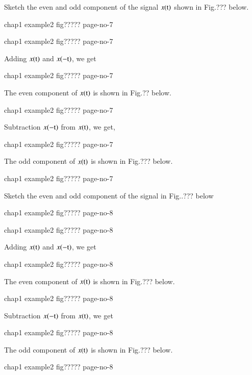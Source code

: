 \begin{exam*}
Sketch the even and odd component of the signal $x(\textrm{t})$ shown in Fig.??? below.
\begin{center}
chap1 example2  fig????? page-no-7 
\end{center}
\end{exam*}
\begin{solution}
\begin{center}
chap1 example2  fig????? page-no-7 
\end{center}

Adding $x(\textrm{t})$ and $x(-\textrm{t})$, we get
\begin{center}
chap1 example2  fig????? page-no-7 
\end{center}

The even component of $x(\textrm{t})$ is shown in Fig.?? below.
\begin{center}
chap1 example2  fig????? page-no-7 
\end{center}

Subtraction $x(-\textrm{t})$ from $x(\textrm{t})$, we get,
\begin{center}
chap1 example2  fig????? page-no-7 
\end{center}

The odd component of $x(\textrm{t})$ is shown in Fig.??? below.
\begin{center}
chap1 example2  fig????? page-no-7 
\end{center}
\end{solution}

\begin{exam*}
Sketch the even and odd component of the signal in Fig..??? below
\begin{center}
chap1 example2  fig????? page-no-8 
\end{center}
\end{exam*}
\begin{solution}
\begin{center}
chap1 example2  fig????? page-no-8 
\end{center}

Adding $x(\textrm{t})$ and $x(-\textrm{t})$, we get
\begin{center}
chap1 example2  fig????? page-no-8 
\end{center}

The even component of $x(\textrm{t})$ is shown in Fig.??? below.
\begin{center}
chap1 example2  fig????? page-no-8 
\end{center}

Subtraction $x(-\textrm{t})$ from $ x(\textrm{t})$, we get
\begin{center}
chap1 example2  fig????? page-no-8 
\end{center}

The odd component of $x(\textrm{t})$ is shown in Fig.??? below.
\begin{center}
chap1 example2  fig????? page-no-8 
\end{center}
\end{solution}


